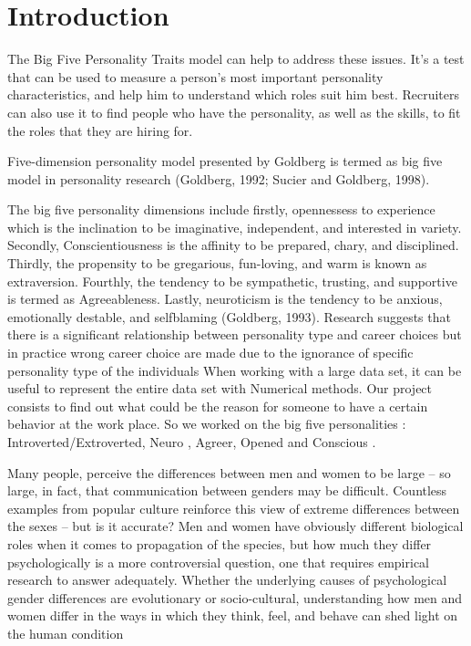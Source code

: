 \section{Introduction}

The Big Five Personality Traits model can help to address these issues. It's a test that can be used to measure a person's most important personality characteristics, and help him to understand which roles suit him best. Recruiters can also use it to find people who have the personality, as well as the skills, to fit the roles that they are hiring for.

Five-dimension personality model presented by Goldberg
is termed as big five model in personality research
(Goldberg, 1992; Sucier and Goldberg, 1998).

The big five personality dimensions include firstly, opennessess
to experience which is the inclination to be imaginative,
independent, and interested in variety. Secondly,
Conscientiousness is the affinity to be prepared, chary,
and disciplined. Thirdly, the propensity to be gregarious,
fun-loving, and warm is known as extraversion. Fourthly,
the tendency to be sympathetic, trusting, and supportive
is termed as Agreeableness. Lastly, neuroticism is the
tendency to be anxious, emotionally destable, and selfblaming (Goldberg, 1993). Research suggests that there is a significant relationship between personality type and career choices but in practice wrong career choice are made due to the ignorance of specific personality type of the individuals
When working with a large data set, it can be useful to represent the entire data set with Numerical methods. Our project consists to find out what could be the reason for someone to have a certain behavior  at the work place. So we worked on the big five personalities :  Introverted/Extroverted,  Neuro , Agreer, Opened  and Conscious .


Many people, perceive the differences between men and women to be large – so large, in fact, that communication between genders may be difficult. Countless examples from popular culture reinforce this view of extreme differences between the sexes – but is it accurate? Men and women have obviously different biological roles when it comes to propagation of the species, but how much they differ psychologically is a more controversial question, one that requires empirical research to answer adequately. Whether the underlying causes of psychological gender differences are evolutionary or socio-cultural, understanding how men and women differ in the ways in which they think, feel, and behave can shed light on the human condition

